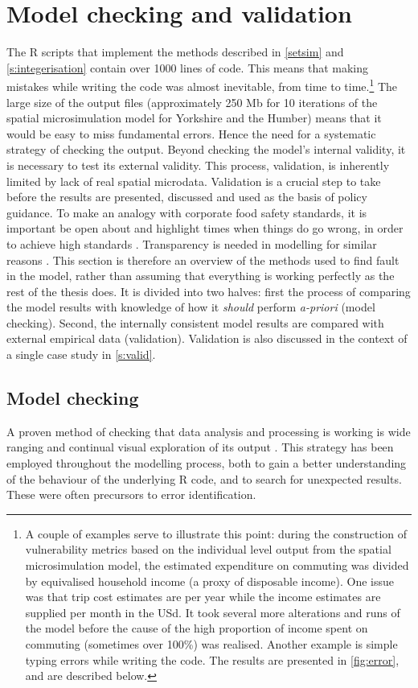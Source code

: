 \documentclass[a4paper, 11pt, twoside]{Thesis}
\begin{document}
\section{Model checking and validation} \label{smeval}

The R scripts that implement the methods described in \cref{setsim} and
\cref{s:integerisation} contain over 1000 lines of code.
This means that making mistakes while writing the code was almost inevitable,
from time to
time.\footnote{
A couple of examples serve to illustrate this point: during the construction of
vulnerability metrics based on the individual level output from the spatial
microsimulation model, the estimated expenditure on commuting was divided
by equivalised household income (a proxy of disposable income). 
One issue was that trip cost estimates are per year
while the income estimates are supplied per month in the USd. It took several
more alterations and runs of the model before the cause of the high proportion
of income spent on commuting (sometimes over 100\%) was realised. Another
example is simple typing errors while writing the code. The results are
presented in \cref{fig:error}, and are described below.
}
The large size of
the output files (approximately 250 Mb for 10 iterations of the spatial
microsimulation model for Yorkshire and the Humber) means that it would
be easy to miss fundamental errors. Hence the need for a
systematic strategy of checking the output. Beyond checking the model's
internal validity, it is necessary to test its external validity. This process,
validation, is inherently limited by lack of real spatial microdata.
Validation is a crucial step to take before the results are
presented, discussed and used as the basis of policy guidance. To make an
analogy with corporate food safety standards, it is important be open about and
highlight times when things do go wrong, in order to achieve high standards
\citep{Powell2011}. Transparency is needed in modelling for similar reasons
\citep{Tamminga2012}. This section is therefore an overview of the methods used
to find fault in the model, rather than assuming that everything is working
perfectly as the rest of the thesis does. It is divided into two halves: first
the process
of comparing the model results with knowledge of how it \emph{should}
perform \emph{a-priori} (model checking). Second, the
internally consistent model results are compared with external
empirical data (validation).
Validation is also discussed in the context of a single case study
in \cref{s:valid}.

\subsection{Model checking}
A proven method of checking that data analysis and processing is working
is wide ranging and continual visual exploration of its output
\citep{janert2010data}.
This strategy has been employed
throughout the modelling process, both to gain a better understanding of the
behaviour of the underlying R code, and to search for unexpected
results. These were often precursors to error identification.
\end{document}
